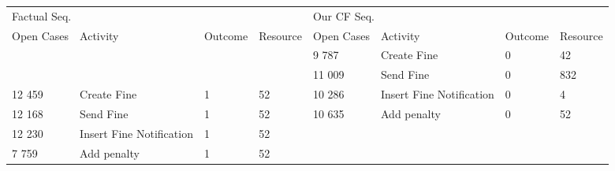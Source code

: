 \begin{tabular}{llllllll}
\toprule
\multicolumn{4}{l}{Factual Seq.} & \multicolumn{4}{l}{Our CF Seq.} \\
Open Cases & Activity & Outcome & Resource & Open Cases & Activity & Outcome & Resource \\
\midrule
 &  &  &  & 9 787 & Create Fine & 0 & 42 \\
 &  &  &  & 11 009 & Send Fine & 0 & 832 \\
12 459 & Create Fine & 1 & 52 & 10 286 & Insert Fine Notification & 0 & 4 \\
12 168 & Send Fine & 1 & 52 & 10 635 & Add penalty & 0 & 52 \\
12 230 & Insert Fine Notification & 1 & 52 &  &  &  &  \\
7 759 & Add penalty & 1 & 52 &  &  &  &  \\
\bottomrule
\end{tabular}
